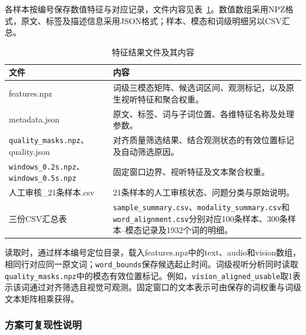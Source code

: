 各样本按编号保存数值特征与对应记录，文件内容见表~\ref{tab:p1_files}。数值数组采用NPZ格式，原文、标签及描述信息采用JSON格式；样本、模态和词级明细另以CSV汇总。

\begin{table}[H]
    \centering\small
    \caption{特征结果文件及其内容}
    \label{tab:p1_files}
    \setlength{\tabcolsep}{6pt}
    \renewcommand{\arraystretch}{1.12}
    \ifdefined\pOneCompactTableBox\else\newsavebox{\pOneCompactTableBox}\fi
    \begin{lrbox}{\pOneCompactTableBox}
    \begin{tabular}{l>{\raggedright\arraybackslash}p{24em}}
        \toprule
        文件 & 内容\\
        \midrule
        features.npz & 词级三模态矩阵、候选词区间、观测标记，以及原生视听特征和聚合权重。\\
        metadata.json & 原文、标签、词与子词位置、各维特征名称及处理参数。\\
        \nolinkurl{quality_masks.npz}、\newline quality.json & 对齐质量筛选结果、结合观测状态的有效位置标记及自动筛选原因。\\
        \nolinkurl{windows_0.2s.npz}、\newline\nolinkurl{windows_0.5s.npz} & 固定窗口边界、视听特征及文本聚合权重。\\
        人工审核\_21条样本.csv & 21条样本的人工审核状态、问题分类与原始说明。\\
        三份CSV汇总表 & \nolinkurl{sample_summary.csv}、\nolinkurl{modality_summary.csv}和\nolinkurl{word_alignment.csv}分别对应100条样本、300条样本--模态记录及1932个词的明细。\\
        \bottomrule
    \end{tabular}
    \end{lrbox}
    \usebox{\pOneCompactTableBox}
\end{table}

读取时，通过样本编号定位目录，载入features.npz中的text、audio和vision数组，相同行对应同一原文词；\nolinkurl{word_bounds}保存候选起止时间。词级视听分析同时读取\nolinkurl{quality_masks.npz}中的模态有效位置标记。例如，\nolinkurl{vision_aligned_usable}取1表示该词通过对齐筛选且视觉可观测。固定窗口的文本表示可由保存的词权重与词级文本矩阵相乘获得。

\subsubsection{方案可复现性说明}
\label{sec:p1_reproducibility}

